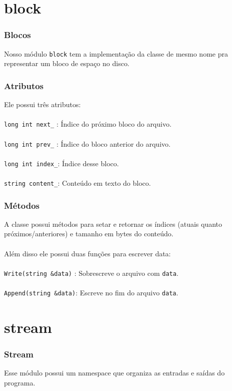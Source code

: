 \documentclass{beamer}
\begin{document}
\section{block}

\begin{frame}
  \frametitle{Blocos}
	Nosso módulo \texttt{block} tem a implementação da classe de mesmo nome pra representar um bloco de espaço no disco.
\end{frame}

\begin{frame}
  \frametitle{Atributos}
  Ele possui três atributos:\\~\\
  
  \texttt{long int next\_} : Índice do próximo bloco do arquivo. \\~\\
  \texttt{long int prev\_} : Índice do bloco anterior do arquivo.\\~\\
  \texttt{long int index\_}: Índice desse bloco.\\~\\
  \texttt{string content\_}: Conteúdo em texto do bloco.
\end{frame}

\begin{frame}
  \frametitle{Métodos}
  A classe possui métodos para setar e retornar os índices (atuais quanto próximos/anteriores) e tamanho em bytes do conteúdo.\\~\\
  Além disso ele possui duas funções para escrever data:\\~\\

  \texttt{Write(string &data)} : Sobrescreve o arquivo com \texttt{data}.\\~\\
  \texttt{Append(string &data)}: Escreve no fim do arquivo \texttt{data}. 
\end{frame}

\section{stream}

\begin{frame}
  \frametitle{Stream}
  Esse módulo possui um namespace que organiza as entradas e saídas do programa.
\end{frame}
\end{document}
